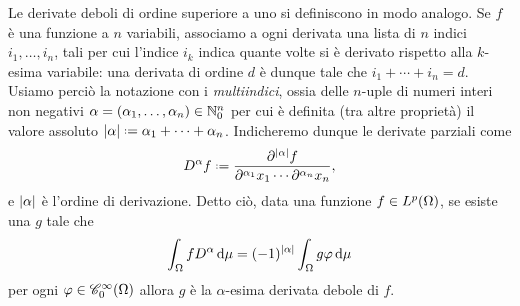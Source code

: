 Le derivate deboli di ordine superiore a uno si definiscono in modo analogo.
Se $f$ è una funzione a $n$ variabili, associamo a ogni derivata una lista di $n$ indici $i_1,\dotsc,i_n$, tali per cui l'indice $i_k$ indica quante volte si è derivato rispetto alla $k$-esima variabile: una derivata di ordine $d$ è dunque tale che $i_1+\dotsb+i_n=d$.
Usiamo perciò la notazione con i \emph{multiindici}, ossia delle $n$-uple di numeri interi non negativi $\alpha=(\alpha_1,\dotsc,\alpha_n)\in\N_0^n$ per cui è definita (tra altre proprietà) il valore assoluto $\abs{\alpha}\defeq\alpha_1+\dotsb+\alpha_n$.
Indicheremo dunque le derivate parziali come
\begin{equation}
    D^\alpha f\defeq\frac{\partial^{\abs{\alpha}}f}{\partial^{\alpha_1}x_1\dotsm\partial^{\alpha_n}x_n},
\end{equation}
e $\abs{\alpha}$ è l'ordine di derivazione.
Detto ciò, data una funzione $f\in\leb[p]{\Omega}$, se esiste una $g$ tale che
\begin{equation}
    \int_\Omega fD^\alpha\,\dd\mu=(-1)^{\abs{\alpha}}\int_\Omega g\phi\,\dd\mu
\end{equation}
per ogni $\phi\in\contsc[\infty]{\Omega}$ allora $g$ è la $\alpha$-esima derivata debole di $f$.

